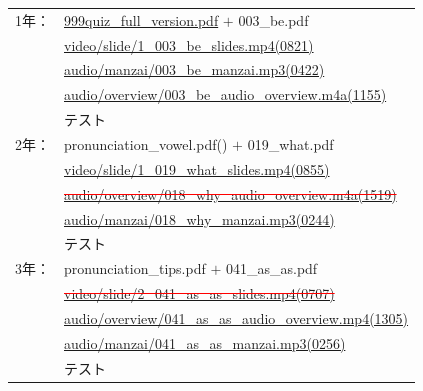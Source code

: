 \documentclass[12pt, jafontscale=0.9247]{jlreq}
\let\textipa\relax
\begin{document}
{  \noindent{}%
  \begin{tabular}{ll}
    1年： & \url{999quiz_full_version.pdf} $+$ 003\_be.pdf                                \\
        & {\url{video/slide/1_003_be_slides.mp4(0821)}}                                 \\
        & {\url{audio/manzai/003_be_manzai.mp3(0422)}}                                  \\
        & {\url{audio/overview/003_be_audio_overview.m4a(1155)}}                        \\
        & テスト                                                                           \\
    2年： & pronunciation\_vowel.pdf(\textipa{/\textscripta /}) $+$ 019\_what.pdf         \\
        & {\url{video/slide/1_019_what_slides.mp4(0855)}}                               \\
        & \textcolor{red}{\sout{\url{audio/overview/018_why_audio_overview.m4a(1519)}}} \\
        & \url{audio/manzai/018_why_manzai.mp3(0244)}                                   \\
        & {テスト}                                                                         \\
    3年： & pronunciation\_{}tips.pdf $+$ 041\_as\_as.pdf                                 \\
        & \textcolor{red}{\sout{\url{video/slide/2_041_as_as_slides.mp4(0707)}}}        \\
        & \url{audio/overview/041_as_as_audio_overview.mp4(1305)}                       \\
        & \url{audio/manzai/041_as_as_manzai.mp3(0256)}                                 \\
        & テスト                                                                           \\
  \end{tabular}























}
\end{document}
